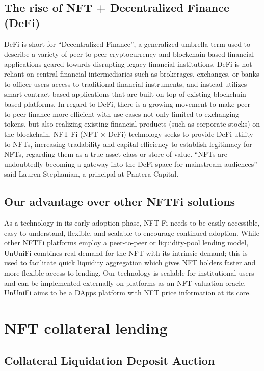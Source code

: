 \documentclass[dvipdfmx]{jsarticle}
\begin{document}
\subsection{The rise of NFT + Decentralized Finance (DeFi)}
DeFi is short for “Decentralized Finance”, a generalized umbrella term used to describe a variety of peer-to-peer cryptocurrency and blockchain-based financial applications geared towards disrupting legacy financial institutions. 
DeFi is not reliant on central financial intermediaries such as brokerages, exchanges, or banks to officer users access to traditional financial instruments, and instead utilizes smart contract-based applications that are built on top of existing blockchain-based platforms. 
In regard to DeFi, there is a growing movement to make peer-to-peer finance more efficient with use-cases not only limited to exchanging tokens, but also realizing existing financial products (such as corporate stocks) on the blockchain.
NFT-Fi (NFT × DeFi) technology seeks to provide DeFi utility to NFTs, increasing tradability and capital efficiency to establish legitimacy for NFTs, regarding them as a true asset class or store of value. 
“NFTs are undoubtedly becoming a gateway into the DeFi space for mainstream audiences” said Lauren Stephanian, a principal at Pantera Capital.

\subsection{Our advantage over other NFTFi solutions}
As a technology in its early adoption phase, NFT-Fi needs to be easily accessible, easy to understand, flexible, and scalable to encourage continued adoption. 
While other NFTFi platforms employ a peer-to-peer or liquidity-pool lending model, UnUniFi combines real demand for the NFT with its intrinsic demand; this is used to facilitate quick liquidity aggregation which gives NFT holders faster and more flexible access to lending. 
Our technology is scalable for institutional users and can be implemented externally on platforms as an NFT valuation oracle. 
UnUniFi aims to be a DApps platform with NFT price information at its core.


\section{NFT collateral lending}

\subsection{Collateral Liquidation Deposit Auction}
\end{document}
